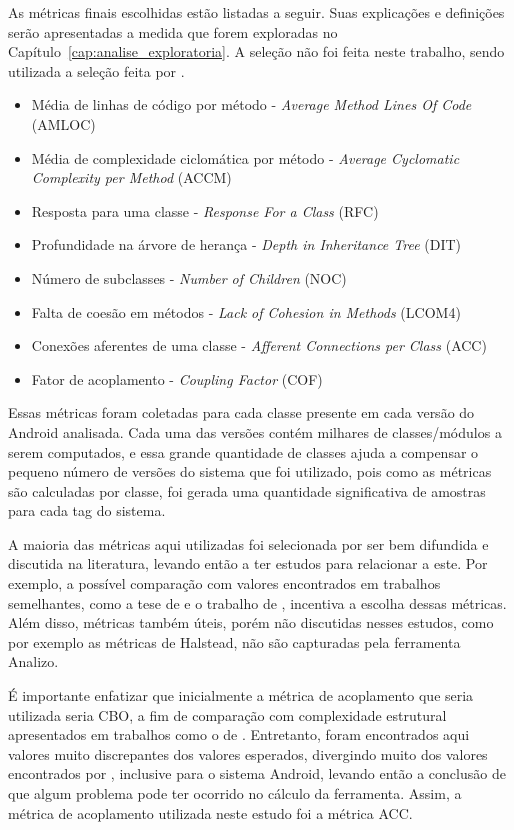 As métricas finais escolhidas estão listadas a seguir. Suas explicações e definições serão apresentadas a medida que forem exploradas no Capítulo~\ref{cap:analise_exploratoria}. A seleção não foi feita neste trabalho, sendo utilizada a seleção feita por .

\begin{itemize}
\item Média de linhas de código por método - \textit{Average Method Lines Of Code} (AMLOC)
\item Média de complexidade ciclomática por método - \textit{Average Cyclomatic Complexity per Method} (ACCM)
\item Resposta para uma classe - \textit{Response For a Class} (RFC)
\item Profundidade na árvore de herança - \textit{Depth in Inheritance Tree} (DIT)
\item Número de subclasses - \textit{Number of Children} (NOC)
\item Falta de coesão em métodos - \textit{Lack of Cohesion in Methods} (LCOM4)
\item Conexões aferentes de uma classe - \textit{Afferent Connections per Class} (ACC)
\item Fator de acoplamento - \textit{Coupling Factor} (COF)
\end{itemize}

Essas métricas foram coletadas para cada classe presente em cada versão do Android analisada. Cada uma das versões contém milhares de classes/módulos a serem computados, e essa grande quantidade de classes ajuda a compensar o pequeno número de versões do sistema que foi utilizado, pois como as métricas são calculadas por classe, foi gerada uma quantidade significativa de amostras para cada tag do sistema.

A maioria das métricas aqui utilizadas foi selecionada por ser bem difundida e discutida na literatura, levando então a ter estudos para relacionar a este. Por exemplo, a possível comparação com valores encontrados em trabalhos semelhantes, como a tese de  e o trabalho de , incentiva a escolha dessas métricas. Além disso, métricas também úteis, porém não discutidas nesses estudos, como por exemplo as métricas de Halstead, não são capturadas pela ferramenta Analizo.

É importante enfatizar que inicialmente a métrica de acoplamento que seria utilizada seria CBO, a fim de comparação com complexidade estrutural apresentados em trabalhos como o de . Entretanto, foram encontrados aqui valores muito discrepantes dos valores esperados, divergindo muito dos valores encontrados por , inclusive para o sistema Android, levando então a conclusão de que algum problema pode ter ocorrido no cálculo da ferramenta. Assim, a métrica de acoplamento utilizada neste estudo foi a métrica ACC.

